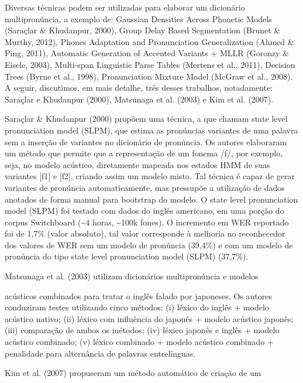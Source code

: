 Diversas t\'ecnicas podem ser utilizadas para elaborar um dicion\'ario
multipron\'uncia, a exemplo de: Gaussian Densities Across Phonetic Models
(Sara\c{c}lar \& Khudanpur, 2000), Group Delay Based Segmentation (Brunet \&
Murthy, 2012), Phones Adaptation and Pronunciation Generalization (Ahmed
\& Ping, 2011), Automatic Generation of Accented Variants + MLLR
(Goronzy \& Eisele, 2003), Multi-span Linguistic Parse Tables (Mertens
et al., 2011), Decision Trees (Byrne et al., 1998), Pronunciation
Mixture Model (McGraw et al., 2008). A seguir, discutimos, em mais
detalhe, tr\^es desses trabalhos, notadamente: Sara\c{c}lar e Khudanpur
(2000), Matsunaga et al. (2003) e Kim et al. (2007).

Sara\c{c}lar \& Khudanpur (2000) prop\~oem uma t\'ecnica, a que chamam state
level pronunciation model (SLPM), que estima as pron\'uncias variantes de
uma palavra sem a inser\c{c}\~ao de variantes no dicion\'ario de pron\'uncia. Os
autores elaboraram um m\'etodo que permite que a representa\c{c}\~ao de um
fonema /f/, por exemplo, seja, no modelo ac\'ustico, diretamente mapeada
nos estados HMM de suas variantes {[}f1{]} e {[}f2{]}, criando assim um
modelo misto. Tal t\'ecnica \'e capaz de gerar variantes de pron\'uncia
automaticamente, mas pressup\~oe a utiliza\c{c}\~ao de dados anotados de forma
manual para bootstrap do modelo. O state level pronunciation model
(SLPM) foi testado com dados do ingl\^es americano, em uma por\c{c}\~ao do
corpus Switchboard (\textasciitilde{}4 horas, \textasciitilde{}100k
fones). O incremento em WER reportado foi de 1,7\% (valor absoluto), tal
valor corresponde à melhoria no reconhecedor dos valores de WER sem um
modelo de pron\'uncia (39,4\%) e com um modelo de pron\'uncia do tipo state
level pronunciation model (SLPM) (37,7\%).

  Matsunaga et al. (2003) utilizam dicion\'arios multipron\'uncia e  modelos

ac\'usticos combinados para tratar o ingl\^es falado por japoneses. Os
autores conduziram testes utilizando cinco m\'etodos: (i) l\'exico do ingl\^es
+ modelo ac\'ustico nativo; (ii) l\'exico com influ\^encia do japon\^es + modelo
ac\'ustico japon\^es; (iii) compara\c{c}\~ao de ambos os m\'etodos; (iv) l\'exico
japon\^es e ingl\^es + modelo ac\'ustico combinado; (v) l\'exico combinado +
modelo ac\'ustico combinado + penalidade para altern\^ancia de palavras
entrel\'inguas.

  Kim et al. (2007) propuseram um m\'etodo autom\'atico  de  cria\c{c}\~ao  de  um

